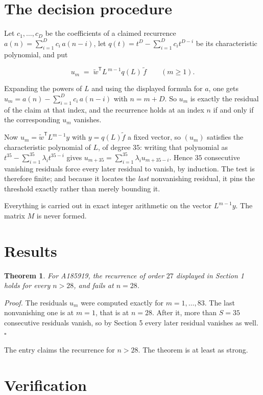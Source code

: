 \documentclass[11pt]{article}
\newtheorem{theorem}{Theorem}
\theoremstyle{definition}
\begin{document}
\section{The decision procedure}

Let $c_1,\dots,c_D$ be the coefficients of a claimed recurrence $a(n) = \sum_{i=1}^{D} c_i\,a(n-i)$, let $q(t) = t^{D} - \sum_{i=1}^{D} c_i t^{D-i}$ be its characteristic polynomial, and put

\[u_m \;=\; \tilde w^{\mathsf T} L^{\,m-1} q(L)\,\tilde f \qquad (m \ge 1).\]

Expanding the powers of $L$ and using the displayed formula for $a$, one gets $u_m = a(n) - \sum_{i=1}^{D} c_i\,a(n-i)$ with $n = m + D$. So $u_m$ is exactly the residual of the claim at that index, and the recurrence holds at an index $n$ if and only if the corresponding $u_m$ vanishes.

Now $u_m = \tilde w^{\mathsf T} L^{m-1} y$ with $y = q(L)\tilde f$ a fixed vector, so $(u_m)$ satisfies the characteristic polynomial of $L$, of degree $35$: writing that polynomial as $t^{35} - \sum_{i=1}^{35} \lambda_i t^{35-i}$ gives $u_{m+35} = \sum_{i=1}^{35} \lambda_i u_{m+35-i}$. Hence $35$ consecutive vanishing residuals force every later residual to vanish, by induction. The test is therefore finite; and because it locates the {\itshape last} nonvanishing residual, it pins the threshold exactly rather than merely bounding it.

Everything is carried out in exact integer arithmetic on the vector $L^{m-1}y$. The matrix $M$ is never formed.

\section{Results}

\begin{theorem} For A185919, the recurrence of order $27$ displayed in Section 1 holds for every $n > 28$, and fails at $n = 28$.\end{theorem}

{\itshape Proof.} The residuals $u_m$ were computed exactly for $m = 1,\dots,83$. The last nonvanishing one is at $m = 1$, that is at $n = 28$. After it, more than $S = 35$ consecutive residuals vanish, so by Section 5 every later residual vanishes as well. $\square$

The entry claims the recurrence for $n > 28$. The theorem is at least as strong.

\section{Verification}
\end{document}
